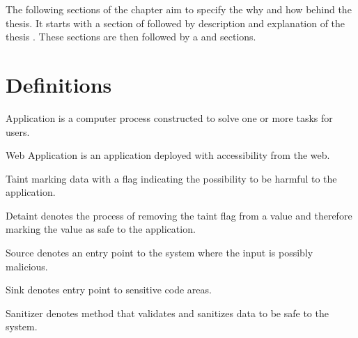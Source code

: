 The following sections of the chapter aim to specify the why and how behind the thesis. It starts with a section of \textit{} followed by \textit{} description and explanation of the thesis \textit{}. These sections are then followed by a \textit{} and \textit{} sections.



\section{Definitions}
\label{Definitions}
\begin{definition}{Application}
    is a computer process constructed to solve one or more tasks for users.
    \\
\end{definition}

\begin{definition}{Web Application}
    is an application deployed with accessibility from the web.
    \\
\end{definition}

\begin{definition}{Taint}
    marking data with a flag indicating the possibility to be harmful to the application.
    \\
\end{definition}

\begin{definition}{Detaint}
    denotes the process of removing the taint flag from a value and therefore marking the value as safe to the application.
    \\
\end{definition}

\begin{definition}{Source}
    denotes an entry point to the system where the input is possibly malicious.
    \\
\end{definition}

\begin{definition}{Sink}
    denotes entry point to sensitive code areas.
    \\
\end{definition}

\begin{definition}{Sanitizer}
    denotes method that validates and sanitizes data to be safe to the system.
    \\
\end{definition}

